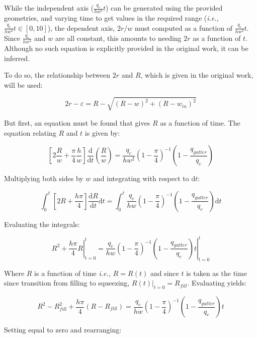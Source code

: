 While the independent axis ($\frac{q_c}{hw^2}t$) can be generated using the provided geometries, and varying
time to get values in the required range (\emph{i.e.,} $\frac{q_c}{hw^2}t \in [0,10]$), the dependent axis,
$2r/w$ must computed as a function of $\frac{q_c}{hw^2}t$. Since $\frac{q_c}{hw^2}$ and $w$ are all constant,
this amounts to needing $2r$ as a function of $t$. Although no such equation
is explicitly provided in the original work, it can be inferred.

To do so, the relationship between $2r$ and $R$, which is given in the original work, will be used:

\begin{equation}
  2r - \varepsilon = R - \sqrt{\left(R - w\right)^2 + \left(R - w_{in}\right)^2}
\end{equation}

But first, an equation must be found that gives $R$ as a function of time. The equation
relating $R$ and $t$ is given by:

\begin{equation}
  \left[2\frac{R}{w} + \frac{\pi}{4}\frac{h}{w}\right]
  \frac{\mathrm{d}}{\mathrm{d}t}\left(\frac{R}{w}\right) = 
  \frac{q_c}{hw^2} \left(1-\frac{\pi}{4}\right)^{-1}
  \left(1-\frac{q_{gutter}}{q_c}\right)
\end{equation}

Multiplying both sides by $w$ and integrating with respect to $\mathrm{d}t$:

$$
  \int_{0}^t{\left[2R + \frac{h\pi}{4}\right]
  \frac{\mathrm{d}R}{\mathrm{d}t}} \mathrm{d}t = 
  \int_{0}^t{\frac{q_c}{hw} \left(1-\frac{\pi}{4}\right)^{-1}
  \left(1-\frac{q_{gutter}}{q_c}\right)} \mathrm{d}t
$$

Evaluating the integrals:

$$ 
  \left. R^2 + \frac{h\pi}{4}R \right|_{t=0}^{t}=
  \left. \frac{q_c}{hw}
  \left(1-\frac{\pi}{4}\right)^{-1}
  \left(1-\frac{q_{gutter}}{q_c}\right)t \right|_{t=0}^{t}
$$

Where $R$ is a function of time \emph{i.e.,} $R=R\left(t\right)$ and since
$t$ is taken as the time since transition from filling to squeezing,
$\left. R\left(t\right)\right|_{t=0} = R_{fill}$. Evaluating yields:

$$
  R^2 - R_{fill}^2 + \frac{h\pi}{4}\left(R-R_{fill}\right) = 
  \frac{q_c}{hw}
  \left(1-\frac{\pi}{4}\right)^{-1}
  \left(1-\frac{q_{gutter}}{q_c}\right)t
$$

Setting equal to zero and rearranging:

